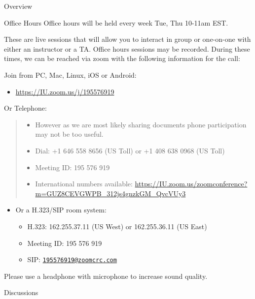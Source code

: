 \begin{edXchapter}{Overview}
\begin{edXsection}{Office Hours}
Office hours will be held every week Tue, Thu 10-11am EST.

These are live sessions that will allow you to interact in group or
one-on-one with either an instructor or a TA. Office hours sessions may
be recorded. During these times, we can be reached via zoom with the
following information for the call:

Join from PC, Mac, Linux, iOS or Android:

\begin{itemize}
\itemsep1pt\parskip0pt
\item
  \url{https://IU.zoom.us/j/195576919}
\end{itemize}

Or Telephone:

\begin{quote}
\begin{itemize}
\itemsep1pt\parskip0pt
\item
  However as we are most likely sharing documents phone participation
  may not be too useful.
\item
  Dial: +1 646 558 8656 (US Toll) or +1 408 638 0968 (US Toll)
\item
  Meeting ID: 195 576 919
\item
  International numbers available:
  \url{https://IU.zoom.us/zoomconference?m=GUZ8CEVGWPB_312js4gnzkGM_QvcVUy3}
\end{itemize}
\end{quote}

\begin{itemize}
\itemsep1pt\parskip0pt
\item
  Or a H.323/SIP room system:

  \begin{itemize}
  \itemsep1pt\parskip0pt
  \item
    H.323: 162.255.37.11 (US West) or 162.255.36.11 (US East)
  \item
    Meeting ID: 195 576 919
  \item
    SIP:
    \href{mailto:195576919@zoomcrc.com}{\nolinkurl{195576919@zoomcrc.com}}
  \end{itemize}
\end{itemize}

Please use a headphone with microphone to increase sound quality.

\end{edXsection}
\begin{edXsection}{Discussions}\label{discussions}


\end{edXsection}
\end{edXchapter}
